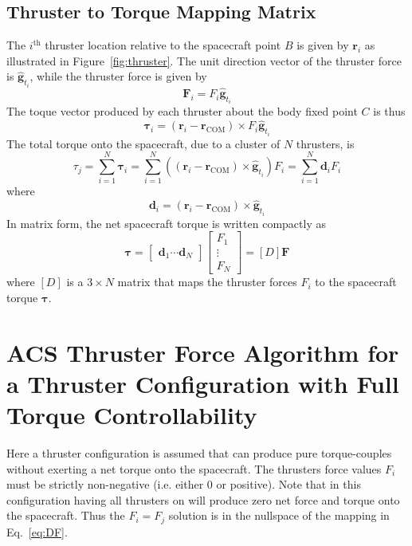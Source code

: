 \documentclass[]{BasiliskReportMemo}
\begin{document}
\subsection{Thruster to Torque Mapping Matrix}
The $i^{\text{th}}$ thruster location relative to the spacecraft point $B$ is given by $\bm r_{i}$ as illustrated in Figure~\ref{fig:thruster}.  The unit direction vector of the thruster force is $\hat{\bm g}_{t_{i}}$, while the thruster force is given by
\begin{equation}
	\label{eq:th:1}
	\bm F_{i} = F_{i} \hat{\bm g}_{t_{i}}
\end{equation}
The toque vector produced by each thruster about the body fixed point $C$ is thus
\begin{equation}
	\bm \tau_{i} = (\bm r_{i} - \bm r_{\text{COM}}) \times F_{i}  \hat{\bm g}_{t_{i}}
\end{equation}
The total torque onto the spacecraft, due to a cluster of $N$ thrusters, is
\begin{equation}
	\tau_{j} = \sum_{i=1}^{N} \bm \tau_{i} 
	= \sum_{i=1}^{N}  ((\bm r_{i} - \bm r_{\text{COM}}) \times \hat{\bm g}_{t_{i}}) F_{i} = \sum_{i=1}^{N}  \bm d_{i} F_{i}
\end{equation}
where 
\begin{equation}
	\label{eq:th1:1}
	\bm d_{i} =    ( \bm r_{i} - \bm r_{\text{COM}})  \times \hat{\bm g}_{t_{i}}
\end{equation}
In matrix form, the net spacecraft torque is written compactly as
\begin{equation}
	\label{eq:DF}
	 \bm\tau = \begin{bmatrix}
		 \bm d_{1} \cdots  \bm d_{N}
	\end{bmatrix} \begin{bmatrix}
		F_{1} \\
		\vdots \\
		F_{N}
	\end{bmatrix} = [D] \bm F
\end{equation}
where $[D]$ is a $3\times N$ matrix that maps the thruster forces $F_{i}$ to the spacecraft torque $\bm \tau$. 


\section{ACS Thruster Force Algorithm for a Thruster Configuration with Full Torque Controllability}
Here a thruster configuration is assumed that can produce pure torque-couples without exerting a net torque onto the spacecraft.  The thrusters force values $F_{i}$ must be strictly non-negative (i.e. either 0 or positive).   Note that in this configuration having all thrusters on will produce zero net force and torque onto the spacecraft.  Thus the $F_{i} = F_{j}$ solution is in the nullspace of the mapping in Eq.~\eqref{eq:DF}.  
\end{document}
